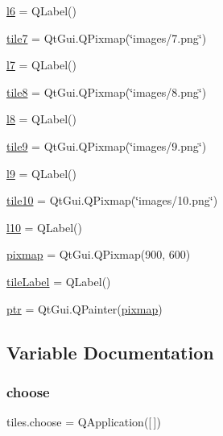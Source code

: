 \begin{DoxyCompactItemize}
\item 
\mbox{\hyperlink{namespacetiles_a0819f43794a70ef7332df1215572b6ce}{l6}} = Q\+Label()
\item 
\mbox{\hyperlink{namespacetiles_a815b3f0652af21c014efc7c388ad764e}{tile7}} = Qt\+Gui.\+Q\+Pixmap(\char`\"{}images/7.png\char`\"{})
\item 
\mbox{\hyperlink{namespacetiles_a8c60d04f5e9dc003d17bd679b0e2d7de}{l7}} = Q\+Label()
\item 
\mbox{\hyperlink{namespacetiles_ac0cd01c17a9e026060341aa74bc3b4ae}{tile8}} = Qt\+Gui.\+Q\+Pixmap(\char`\"{}images/8.png\char`\"{})
\item 
\mbox{\hyperlink{namespacetiles_a5d33be17753db433ec649d70534adc65}{l8}} = Q\+Label()
\item 
\mbox{\hyperlink{namespacetiles_a069103305595410ecbc23645ec607bc0}{tile9}} = Qt\+Gui.\+Q\+Pixmap(\char`\"{}images/9.png\char`\"{})
\item 
\mbox{\hyperlink{namespacetiles_afbefb9ab7b2f488acfa44efcaa78b934}{l9}} = Q\+Label()
\item 
\mbox{\hyperlink{namespacetiles_a67b2b0c7f78614262653eed92e0cbd16}{tile10}} = Qt\+Gui.\+Q\+Pixmap(\char`\"{}images/10.png\char`\"{})
\item 
\mbox{\hyperlink{namespacetiles_aae1be53b3a011f7f21f6796aa59ec9c3}{l10}} = Q\+Label()
\item 
\mbox{\hyperlink{namespacetiles_a2f61bf9f6911ee0493b484f713df252f}{pixmap}} = Qt\+Gui.\+Q\+Pixmap(900, 600)
\item 
\mbox{\hyperlink{namespacetiles_a289fa1b53195b4dbddbd4292ea725d83}{tile\+Label}} = Q\+Label()
\item 
\mbox{\hyperlink{namespacetiles_a1f0e8aa73ad9dec0ab47c5756348aec4}{ptr}} = Qt\+Gui.\+Q\+Painter(\mbox{\hyperlink{namespacetiles_a2f61bf9f6911ee0493b484f713df252f}{pixmap}})
\end{DoxyCompactItemize}


\subsection{Variable Documentation}
\mbox{\label{namespacetiles_abfbd77603b58941b397097350cd4b2ad}} 
\subsubsection{\texorpdfstring{choose}{choose}}
{\footnotesize\ttfamily tiles.\+choose = Q\+Application(\mbox{[}$\,$\mbox{]})}



